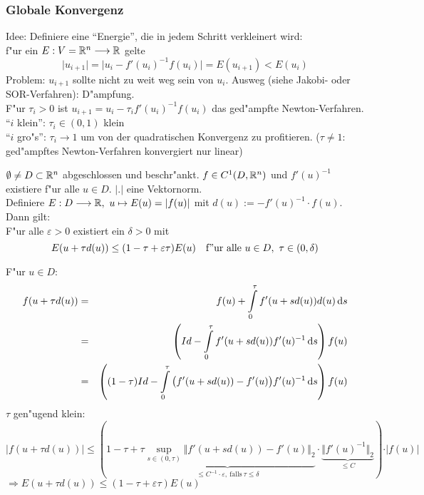 \documentclass{scrartcl}
\begin{document}
\subsubsection{Globale Konvergenz}
Idee: Definiere eine "`Energie"', die in jedem Schritt verkleinert wird: \\
f"ur ein $E: V = \mathbb{R}^n \longrightarrow \mathbb{R}$ gelte 
$$\vert u_{i+1} \vert  = \vert u_i - f'(u_i)^{-1} f(u_i) \vert  = E(u_{i+1}) < E(u_i)$$
Problem: $u_{i+1}$ sollte nicht zu weit weg sein von $u_i$. Ausweg (siehe Jakobi- oder SOR-Verfahren): D"ampfung. \\
F"ur $\tau_i > 0$ ist $u_{i+1} = u_i - \tau_i f'(u_i)^{-1} f(u_i)$ das ged"ampfte Newton-Verfahren. \\
"`$i$ klein"': $\tau_i \in (0,1)$ klein \\
"`$i$ gro"s"': $\tau_i \rightarrow 1$ um von der quadratischen Konvergenz zu profitieren. ($\tau \neq 1$: ged"ampftes Newton-Verfahren konvergiert nur linear)

\begin{Lemma}
$\emptyset \neq D \subset \mathbb{R}^n$ abgeschlossen und beschr"ankt. $f \in C^1(D, \mathbb{R}^n)$ und $f'(u)^{-1}$ existiere f"ur alle $u \in D$. $\vert . \vert$ eine Vektornorm. \\ Definiere $E: D \longrightarrow \mathbb{R}, \ u \mapsto E(u) = \vert f(u) \vert$ mit $d(u) := -f'(u)^{-1} \cdot f(u)$. Dann gilt: \\
F"ur alle $\varepsilon > 0$ existiert ein $\delta > 0$ mit 
$$E(u + \tau d(u)) \leq (1 - \tau + \varepsilon \tau) E(u) \quad \mathrm{f"ur \ alle \ } u \in D, \ \tau \in (0,\delta)$$
\end{Lemma}
\begin{Bew}
F"ur $u \in D$: 
\begin{eqnarray*}
f(u + \tau d(u)) & = & f(u) + \int\limits_0^\tau f'(u + sd(u)) d(u) \, \mathrm{d} s \\
& = & \left(Id - \int\limits_0^\tau f'(u + sd(u)) f'(u)^{-1} \, \mathrm{d} s \right) f(u) \\
& = & \left( (1- \tau) Id - \int\limits_0^\tau \big(f'(u + s d(u)) - f'(u) \big) f'(u)^{-1} \, \mathrm{d} s \right)  f(u)
\end{eqnarray*}
$\tau$ gen"ugend klein:
$$\vert f(u + \tau d(u)) \vert \leq (1 - \tau + \underbrace{\tau \sup\limits_{s \in (0,\tau)} \Vert f'(u + s d(u)) - f'(u) \Vert_2}_{\leq C^{-1} \cdot \varepsilon, \mathrm{\ falls\ } \tau \leq \delta} \cdot \underbrace{\Vert f'(u)^{-1} \Vert_2}_{\leq C} ) \cdot \vert f(u) \vert$$
$\Rightarrow E(u + \tau d(u)) \leq (1 - \tau + \varepsilon \tau) E(u)$
\end{Bew}
\end{document}
